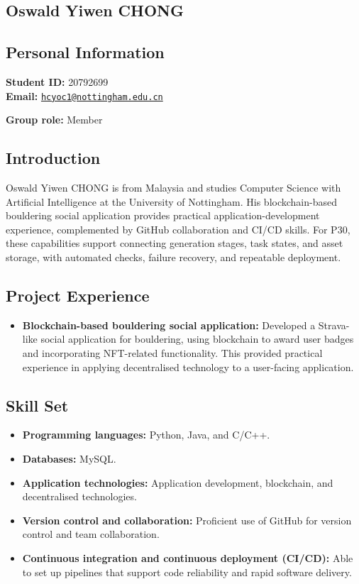 \documentclass[a4paper,12pt]{article}
\newcommand{\PersonalInformation}[2]{%
  \subsection*{Personal Information}
  \if\relax\detokenize{#1}\relax\else
  \noindent\textbf{Student ID:} #1\\
  \fi
  \textbf{Email:} #2\par
}
\begin{document}
\subsection{Oswald Yiwen CHONG}
\PersonalInformation{20792699}{\href{mailto:hcyoc1@nottingham.edu.cn}{\nolinkurl{hcyoc1@nottingham.edu.cn}}}
\noindent\textbf{Group role:} Member\par

\subsection*{Introduction}
Oswald Yiwen CHONG is from Malaysia and studies Computer Science with Artificial Intelligence at the University of Nottingham. His blockchain-based bouldering social application provides practical application-development experience, complemented by GitHub collaboration and CI/CD skills. For P30, these capabilities support connecting generation stages, task states, and asset storage, with automated checks, failure recovery, and repeatable deployment.

\subsection*{Project Experience}
\begin{itemize}
  \item \textbf{Blockchain-based bouldering social application:} Developed a Strava-like social application for bouldering, using blockchain to award user badges and incorporating NFT-related functionality. This provided practical experience in applying decentralised technology to a user-facing application.
\end{itemize}

\subsection*{Skill Set}
\begin{itemize}
  \item \textbf{Programming languages:} Python, Java, and C/C++.
  \item \textbf{Databases:} MySQL.
  \item \textbf{Application technologies:} Application development, blockchain, and decentralised technologies.
  \item \textbf{Version control and collaboration:} Proficient use of GitHub for version control and team collaboration.
  \item \textbf{Continuous integration and continuous deployment (CI/CD):} Able to set up pipelines that support code reliability and rapid software delivery.
\end{itemize}
\end{document}
